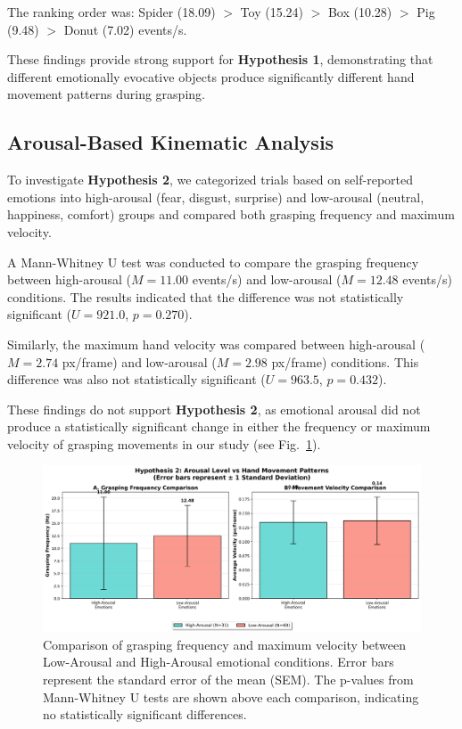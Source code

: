 \documentclass[conference]{IEEEtran}
\begin{document}
The ranking order was: Spider (18.09) $>$ Toy (15.24) $>$ Box (10.28) $>$ Pig (9.48) $>$ Donut (7.02) events/s.

These findings provide strong support for \textbf{Hypothesis 1}, demonstrating that different emotionally evocative objects produce significantly different hand movement patterns during grasping.

\subsection{Arousal-Based Kinematic Analysis}

To investigate \textbf{Hypothesis 2}, we categorized trials based on self-reported emotions into high-arousal (fear, disgust, surprise) and low-arousal (neutral, happiness, comfort) groups and compared both grasping frequency and maximum velocity.

A Mann-Whitney U test was conducted to compare the grasping frequency between high-arousal ($M=11.00$ events/s) and low-arousal ($M=12.48$ events/s) conditions. The results indicated that the difference was not statistically significant ($U = 921.0$, $p = 0.270$).

Similarly, the maximum hand velocity was compared between high-arousal ($M=2.74$ px/frame) and low-arousal ($M=2.98$ px/frame) conditions. This difference was also not statistically significant ($U = 963.5$, $p = 0.432$).

These findings do not support \textbf{Hypothesis 2}, as emotional arousal did not produce a statistically significant change in either the frequency or maximum velocity of grasping movements in our study (see Fig.~\ref{fig:arousal-comparison}).

\begin{figure}[H]
    \centering
    \includegraphics[width=\columnwidth]{figures/hypothesis2_arousal_comparison.png}
    \caption{Comparison of grasping frequency and maximum velocity between Low-Arousal and High-Arousal emotional conditions. Error bars represent the standard error of the mean (SEM). The p-values from Mann-Whitney U tests are shown above each comparison, indicating no statistically significant differences.}
    \label{fig:arousal-comparison}
\end{figure}
\end{document}
